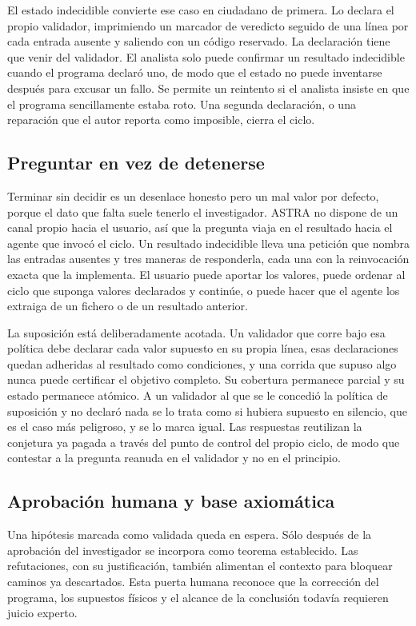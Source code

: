 \documentclass[11pt,a4paper]{article}
\begin{document}
El estado indecidible convierte ese caso en ciudadano de primera. Lo declara el propio validador, imprimiendo un marcador de veredicto seguido de una línea por cada entrada ausente y saliendo con un código reservado. La declaración tiene que venir del validador. El analista solo puede confirmar un resultado indecidible cuando el programa declaró uno, de modo que el estado no puede inventarse después para excusar un fallo. Se permite un reintento si el analista insiste en que el programa sencillamente estaba roto. Una segunda declaración, o una reparación que el autor reporta como imposible, cierra el ciclo.

\subsection{Preguntar en vez de detenerse}

Terminar sin decidir es un desenlace honesto pero un mal valor por defecto, porque el dato que falta suele tenerlo el investigador. ASTRA no dispone de un canal propio hacia el usuario, así que la pregunta viaja en el resultado hacia el agente que invocó el ciclo. Un resultado indecidible lleva una petición que nombra las entradas ausentes y tres maneras de responderla, cada una con la reinvocación exacta que la implementa. El usuario puede aportar los valores, puede ordenar al ciclo que suponga valores declarados y continúe, o puede hacer que el agente los extraiga de un fichero o de un resultado anterior.

La suposición está deliberadamente acotada. Un validador que corre bajo esa política debe declarar cada valor supuesto en su propia línea, esas declaraciones quedan adheridas al resultado como condiciones, y una corrida que supuso algo nunca puede certificar el objetivo completo. Su cobertura permanece parcial y su estado permanece atómico. A un validador al que se le concedió la política de suposición y no declaró nada se lo trata como si hubiera supuesto en silencio, que es el caso más peligroso, y se lo marca igual. Las respuestas reutilizan la conjetura ya pagada a través del punto de control del propio ciclo, de modo que contestar a la pregunta reanuda en el validador y no en el principio.

\subsection{Aprobación humana y base axiomática}

Una hipótesis marcada como validada queda en espera. Sólo después de la aprobación del investigador se incorpora como teorema establecido. Las refutaciones, con su justificación, también alimentan el contexto para bloquear caminos ya descartados. Esta puerta humana reconoce que la corrección del programa, los supuestos físicos y el alcance de la conclusión todavía requieren juicio experto.
\end{document}
